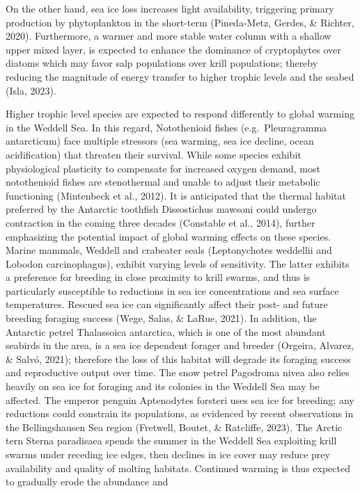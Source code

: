 \documentclass[
]{article}
\begin{document}
On the other hand, sea ice loss increases light availability, triggering
primary production by phytoplankton in the short-term (Pineda-Metz,
Gerdes, \& Richter, 2020). Furthermore, a warmer and more stable water
column with a shallow upper mixed layer, is expected to enhance the
dominance of cryptophytes over diatoms which may favor salp populations
over krill populations; thereby reducing the magnitude of energy
transfer to higher trophic levels and the seabed (Isla, 2023).

Higher trophic level species are expected to respond differently to
global warming in the Weddell Sea. In this regard, Notothenioid fishes
(e.g.~Pleuragramma antarcticum) face multiple stressors (sea warming,
sea ice decline, ocean acidification) that threaten their survival.
While some species exhibit physiological plasticity to compensate for
increased oxygen demand, most notothenioid fishes are stenothermal and
unable to adjust their metabolic functioning (Mintenbeck et al., 2012).
It is anticipated that the thermal habitat preferred by the Antarctic
toothfish Dissostichus mawsoni could undergo contraction in the coming
three decades (Constable et al., 2014), further emphasizing the
potential impact of global warming effects on these species. Marine
mammals, Weddell and crabeater seals (Leptonychotes weddellii and
Lobodon carcinophagus), exhibit varying levels of sensitivity. The
latter exhibits a preference for breeding in close proximity to krill
swarms, and thus is particularly susceptible to reductions in sea ice
concentrations and sea surface temperatures. Rescued sea ice can
significantly affect their post- and future breeding foraging success
(Wege, Salas, \& LaRue, 2021). In addition, the Antarctic petrel
Thalassoica antarctica, which is one of the most abundant seabirds in
the area, is a sea ice dependent forager and breeder (Orgeira, Alvarez,
\& Salvó, 2021); therefore the loss of this habitat will degrade its
foraging success and reproductive output over time. The snow petrel
Pagodroma nivea also relies heavily on sea ice for foraging and its
colonies in the Weddell Sea may be affected. The emperor penguin
Aptenodytes forsteri uses sea ice for breeding; any reductions could
constrain its populations, as evidenced by recent observations in the
Bellingshausen Sea region (Fretwell, Boutet, \& Ratcliffe, 2023). The
Arctic tern Sterna paradisaea spends the summer in the Weddell Sea
exploiting krill swarms under receding ice edges, then declines in ice
cover may reduce prey availability and quality of molting habitats.
Continued warming is thus expected to gradually erode the abundance and
\end{document}
